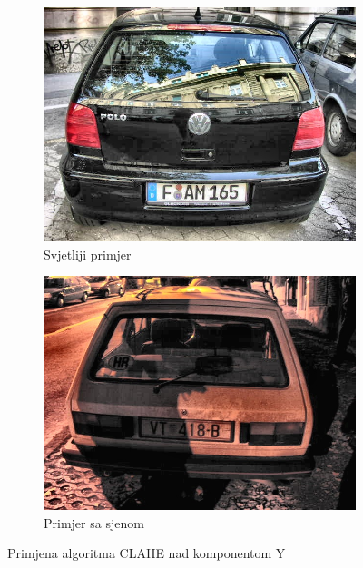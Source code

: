 \documentclass[times, utf8, diplomski]{fer}
\begin{document}
\begin{figure}[H]
     \begin{subfigure}[b]{0.4\textwidth}
         \centering
         \includegraphics[width=\textwidth]{figures/ce_examples/3/clahe.jpg}
         \caption{Svjetliji primjer}
         \label{fig:ce_clahe_svijetli}
     \end{subfigure}
     \hspace{1cm}
     \begin{subfigure}[b]{0.4\textwidth}
         \centering
         \includegraphics[width=\textwidth]{figures/ce_examples/4/clahe.jpg}
         \caption{Primjer sa sjenom}
         \label{fig:ce_clahe_sjena}
     \end{subfigure}
        \caption{Primjena algoritma CLAHE nad komponentom Y}
        \label{fig:ce_clahe}
\end{figure}
\end{document}
